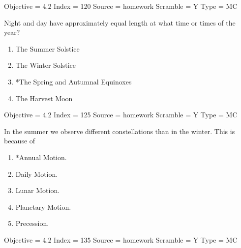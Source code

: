 \documentclass[11pt]{article}
\begin{document}
\begin{enumerate}
\begin{minipage}{\textwidth}
\begin{minipage}{\textwidth}
Objective = 4.2
Index = 120
Source = homework
Scramble = Y
Type = MC
\end{minipage}
\end{minipage}
\vskip 0.20in

\begin{minipage}{\textwidth}
\begin{minipage}{\textwidth}
\item Night and day have approximately equal length at what time or times of the year?
\begin{multicols}{2}
\begin{enumerate} 
\setlength{\itemsep}{1pt} 
\setlength{\parskip}{0pt} 
\setlength{\parsep}{0pt}
\setlength{\multicolsep}{1pt} 
\item The Summer Solstice
\item The Winter Solstice
\item *The Spring and Autumnal Equinoxes
\item The Harvest Moon
\end{enumerate} 
\vfill 
\end{multicols}

Objective = 4.2
Index = 125
Source = homework
Scramble = Y
Type = MC
\end{minipage}
\end{minipage}
\vskip 0.20in

\begin{minipage}{\textwidth}
\begin{minipage}{\textwidth}
\item In the summer we observe different constellations than in the winter. This is because of \underline{\hspace{0.5in}}
\begin{multicols}{3}
\begin{enumerate} 
\setlength{\itemsep}{1pt} 
\setlength{\parskip}{0pt} 
\setlength{\parsep}{0pt}
\setlength{\multicolsep}{1pt} 
\item *Annual Motion.
\item Daily Motion.
\item Lunar Motion.
\item Planetary Motion.
\item Precession.
\end{enumerate} 
\vfill 
\end{multicols}

Objective = 4.2
Index = 135
Source = homework
Scramble = Y
Type = MC
\end{minipage}
\end{minipage}
\vskip 0.20in


\end{enumerate}
\end{document}

